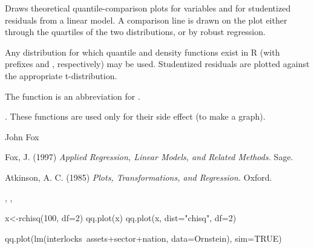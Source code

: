 \documentclass{article}
\begin{document}
\begin{Details}\relax
Draws theoretical quantile-comparison plots for variables and for studentized residuals
from a linear model. A comparison line is drawn on the plot either through the quartiles
of the two distributions, or by robust regression. 

Any distribution for which quantile and
density functions exist in R (with prefixes  and , respectively) may be used. 
Studentized residuals are plotted against the
appropriate t-distribution.

The function  is an abbreviation for .
\end{Details}
\begin{Value}
. These functions are used only for their side effect (to make a graph).
\end{Value}
\begin{Author}\relax
John Fox 
\end{Author}
\begin{References}\relax
Fox, J. (1997)
\emph{Applied Regression, Linear Models, and Related Methods.} Sage.

Atkinson, A. C. (1985)
\emph{Plots, Transformations, and Regression.} Oxford.
\end{References}
\begin{SeeAlso}\relax
{}, ,
\end{SeeAlso}
\begin{Examples}
\begin{ExampleCode}
x<-rchisq(100, df=2)
qq.plot(x)
qq.plot(x, dist="chisq", df=2)

qq.plot(lm(interlocks~assets+sector+nation, data=Ornstein), sim=TRUE)
\end{ExampleCode}
\end{Examples}
\end{document}
